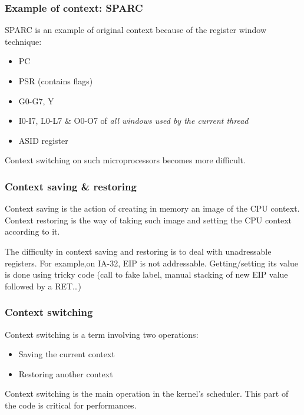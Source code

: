 
\begin{frame}
  \frametitle{Example of context: SPARC}

  SPARC is an example of original context because of the register
  window technique:

  \begin{itemize}
  \item
    PC
  \item
    PSR (contains flags)
  \item
    G0-G7, Y
  \item
    I0-I7, L0-L7 \& O0-O7 of \emph{all windows used by the current thread}
  \item
    ASID register
  \end{itemize}

  \-

  Context switching on such microprocessors becomes more difficult.

\end{frame}


\begin{frame}
  \frametitle{Context saving \& restoring}

  Context saving is the action of creating in memory an image of the
  CPU context. Context restoring is the way of taking such image and
  setting the CPU context according to it.

  \-

  The difficulty in context saving and restoring is to deal with
  unadressable registers. For example,on IA-32, EIP is not
  addressable. Getting/setting its value is done using tricky code
  (call to fake label, manual stacking of new EIP value followed by a
  RET\ldots)

\end{frame}


\begin{frame}
  \frametitle{Context switching}

  Context switching is a term involving two operations:

  \begin{itemize}
  \item
    Saving the current context
  \item
    Restoring another context
  \end{itemize}

  \-

  Context switching is the main operation in the kernel's
  scheduler. This part of the code is critical for performances.

  \begin{center}
  \end{center}

\end{frame}

